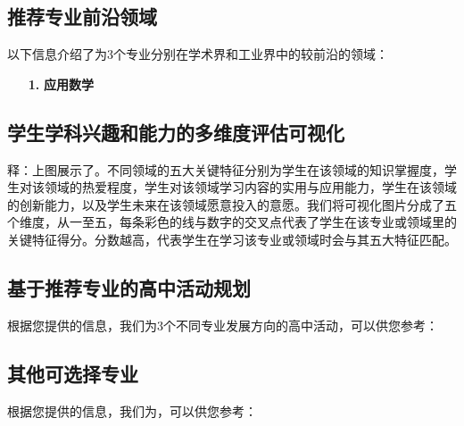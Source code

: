 \documentclass[12pt]{article}
\def\username{Xingyu Zhu\xspace}
\def\majorone{应用数学\xspace}
\begin{document}
\begin{CJK*}{UTF8}{gbsn}
\subsection*{推荐专业前沿领域}
以下信息介绍了为3个专业分别在学术界和工业界中的较前沿的领域：
\begin{itemize}[leftmargin=1cm]
\item[\textbf{1.}] \textbf{\majorone}
\end{itemize}


\newpage
\vfill
\subsection*{学生学科兴趣和能力的多维度评估可视化}
\begin{itemize}
\end{itemize}    %

\begin{flushleft}
释：上图展示了。不同领域的五大关键特征分别为学生在该领域的知识掌握度，学生对该领域的热爱程度，学生对该领域学习内容的实用与应用能力，学生在该领域的创新能力，以及学生未来在该领域愿意投入的意愿。我们将可视化图片分成了五个维度，从一至五，每条彩色的线与数字的交叉点代表了学生在该专业或领域里的关键特征得分。分数越高，代表学生在学习该专业或领域时会与其五大特征匹配。




\hspace{0pt}
\vfill
\vspace{0cm}
\subsection*{基于推荐专业的高中活动规划}
根据您提供的信息，我们为3个不同专业发展方向的高中活动，可以供您参考：
\begin{itemize}[leftmargin=1.2cm]
    
\end{itemize}
\vfill




\newpage
\hspace{0pt}
\vspace{0cm}
\subsection*{其他可选择专业}
根据您提供的信息，我们为，可以供您参考：
\begin{itemize}[leftmargin=1.2cm]


\end{itemize}
\end{flushleft}
\end{CJK*}
\end{document}
